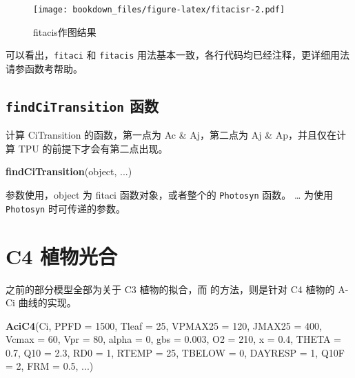 \documentclass[]{krantz}
\makeatletter
\newenvironment{Shaded}{\begin{snugshade}}{\end{snugshade}}
\newcommand{\KeywordTok}[1]{\textcolor[rgb]{0.13,0.29,0.53}{\textbf{#1}}}
\newcommand{\DataTypeTok}[1]{\textcolor[rgb]{0.13,0.29,0.53}{#1}}
\newcommand{\DecValTok}[1]{\textcolor[rgb]{0.00,0.00,0.81}{#1}}
\newcommand{\FloatTok}[1]{\textcolor[rgb]{0.00,0.00,0.81}{#1}}
\newcommand{\NormalTok}[1]{#1}
\newenvironment{kframe}{%
\medskip{}
\setlength{\fboxsep}{.8em}
 \def\at@end@of@kframe{}%
 \ifinner\ifhmode%
  \def\at@end@of@kframe{\end{minipage}}%
  \begin{minipage}{\columnwidth}%
 \fi\fi%
 \def\FrameCommand##1{\hskip\@totalleftmargin \hskip-\fboxsep
 \colorbox{shadecolor}{##1}\hskip-\fboxsep
     \hskip-\linewidth \hskip-\@totalleftmargin \hskip\columnwidth}%
 \MakeFramed {\advance\hsize-\width
   \@totalleftmargin\z@ \linewidth\hsize
   \@setminipage}}%
 {\par\unskip\endMakeFramed%
 \at@end@of@kframe}
\renewenvironment{Shaded}{\begin{kframe}}{\end{kframe}}
\theoremstyle{definition}
\theoremstyle{definition}
\theoremstyle{definition}
\theoremstyle{remark}
\makeatother
\begin{document}
\begin{figure}
\centering
\texttt{[image: bookdown\_files/figure-latex/fitacisr-2.pdf]}
\caption{\label{fig:fitacisr}fitacis作图结果}
\end{figure}

可以看出，\texttt{fitaci} 和 \texttt{fitacis}
用法基本一致，各行代码均已经注释，更详细用法请参函数考帮助。

\subsection{\texorpdfstring{\texttt{findCiTransition}
函数}{findCiTransition 函数}}\label{transition}

计算 CiTransition 的函数，第一点为 Ac \& Aj，第二点为 Aj \&
Ap，并且仅在计算 TPU 的前提下才会有第二点出现。

\begin{Shaded}
\begin{Highlighting}[]
\KeywordTok{findCiTransition}\NormalTok{(object, ...)}
\end{Highlighting}
\end{Shaded}

参数使用，object 为 fitaci 函数对象，或者整个的 \texttt{Photosyn} 函数。
\ldots{} 为使用 \texttt{Photosyn} 时可传递的参数。

\section{C4 植物光合}\label{c4}

之前的部分模型全部为关于 C3 植物的拟合，而
\citet{Caemmerer2000Biochemical} 的方法，则是针对 C4 植物的 A-Ci
曲线的实现。

\begin{Shaded}
\begin{Highlighting}[]
\KeywordTok{AciC4}\NormalTok{(Ci, }\DataTypeTok{PPFD =} \DecValTok{1500}\NormalTok{, }\DataTypeTok{Tleaf =} \DecValTok{25}\NormalTok{, }\DataTypeTok{VPMAX25 =} \DecValTok{120}\NormalTok{, }
      \DataTypeTok{JMAX25 =} \DecValTok{400}\NormalTok{, }\DataTypeTok{Vcmax =} \DecValTok{60}\NormalTok{, }\DataTypeTok{Vpr =} \DecValTok{80}\NormalTok{, }
      \DataTypeTok{alpha =} \DecValTok{0}\NormalTok{, }\DataTypeTok{gbs =} \FloatTok{0.003}\NormalTok{, }\DataTypeTok{O2 =} \DecValTok{210}\NormalTok{, }
      \DataTypeTok{x =} \FloatTok{0.4}\NormalTok{, }\DataTypeTok{THETA =} \FloatTok{0.7}\NormalTok{, }\DataTypeTok{Q10 =} \FloatTok{2.3}\NormalTok{, }
      \DataTypeTok{RD0 =} \DecValTok{1}\NormalTok{, }\DataTypeTok{RTEMP =} \DecValTok{25}\NormalTok{, }\DataTypeTok{TBELOW =} \DecValTok{0}\NormalTok{, }
      \DataTypeTok{DAYRESP =} \DecValTok{1}\NormalTok{, }\DataTypeTok{Q10F =} \DecValTok{2}\NormalTok{, }\DataTypeTok{FRM =} \FloatTok{0.5}\NormalTok{, ...)}
\end{Highlighting}
\end{Shaded}
\end{document}
